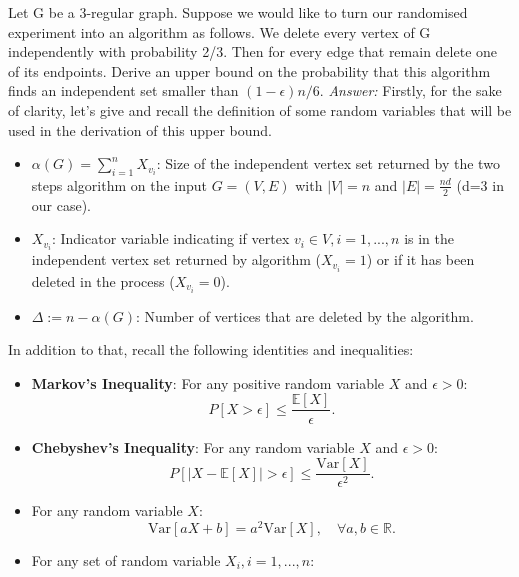 \documentclass[10pt]{article}
\newenvironment{exercise}[2][Exercise]{\begin{trivlist}
  \item[\hskip \labelsep {\bfseries #1}\hskip \labelsep {\bfseries #2.}]}{\end{trivlist}}
\begin{document}
  \begin{exercise}{1c} Let G be a 3-regular graph. Suppose we would like to turn our randomised experiment into an algorithm as follows. We delete every vertex of G independently with probability 2/3. Then for every edge that remain delete one of its endpoints. Derive an upper bound on the probability that this algorithm finds an independent set smaller than $(1-\epsilon)n/6$. \newline
 \emph{Answer:} Firstly, for the sake of clarity, let's give and recall the definition of some random variables that will be used in the derivation of this upper bound. 
 \begin{itemize}
 \item $\alpha(G) = \sum_{i=1}^{n} X_{v_i}$: Size of the independent vertex set returned by the two steps algorithm on the input $G=(V,E)$ with $|V| =n$ and  $|E| = \frac{nd}{2}$ (d=3 in our case).
 \item $X_{v_i}$: Indicator variable indicating if vertex $v_i \in V, i = 1,...,n$ is in the independent vertex set returned by algorithm ($X_{v_i}=1$) or if it has been deleted in the process ($X_{v_i}=0$). 
 \item $\Delta :=  n - \alpha(G)$: Number of vertices that are deleted by the algorithm.
 \end{itemize}
 In addition to that, recall the following identities and inequalities:
 \begin{itemize}
  \item \textbf{Markov's Inequality}: For any positive random variable $X$ and $\epsilon > 0$:
 \begin{equation}
 \label{eq:markov}
 P[X > \epsilon ] \leq \frac{\mathbb{E}[X]}{\epsilon}.
 \end{equation}
 \item \textbf{Chebyshev's Inequality}: For any random variable $X$ and $\epsilon > 0$:
 \begin{equation}
 \label{eq:chebychev}
 P[|X-\mathbb{E}[X]| > \epsilon ] \leq \frac{\mathrm{Var}[X]}{\epsilon^2}.
 \end{equation}
 \item For any random variable $X$:
  \begin{equation}
 \label{eq:varprop1}
\mathrm{Var}[aX + b] = a^2\mathrm{Var}[X], \quad \forall a,b \in \mathbb{R}.
 \end{equation}
 \item For any set of random variable $X_i, i = 1,...,n$:
   \begin{equation}

\end{equation}
\end{itemize}
\end{exercise}
\end{document}
